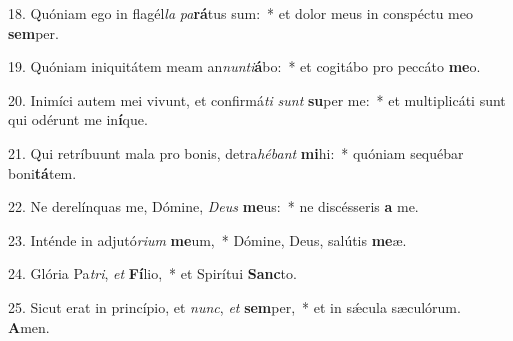 18. Quóniam ego in flagél\textit{la} \textit{pa}\textbf{rá}tus sum:~*  et dolor meus in conspéctu meo \textbf{sem}per.\

19. Quóniam iniquitátem meam an\textit{nun}\textit{ti}\textbf{á}bo:~*  et cogitábo pro peccáto \textbf{me}o.\

20. Inimíci autem mei vivunt, et confirmá\textit{ti} \textit{sunt} \textbf{su}per me:~*  et multiplicáti sunt qui odérunt me in\textbf{í}que.\

21. Qui retríbuunt mala pro bonis, detra\textit{hé}\textit{bant} \textbf{mi}hi:~*  quóniam sequébar boni\textbf{tá}tem.\

22. Ne derelínquas me, Dómine, \textit{De}\textit{us} \textbf{me}us:~*  ne discésseris \textbf{a} me.\

23. Inténde in adjutó\textit{ri}\textit{um} \textbf{me}um,~*  Dómine, Deus, salútis \textbf{me}æ.\

24. Glória Pa\textit{tri}, \textit{et} \textbf{Fí}lio,~*  et Spirítui \textbf{Sanc}to.\

25. Sicut erat in princípio, et \textit{nunc}, \textit{et} \textbf{sem}per,~*  et in sǽcula sæculórum. \textbf{A}men.\

